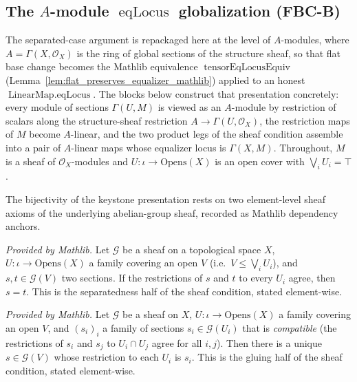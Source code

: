 \subsection{The \texorpdfstring{$A$}{A}-module \texorpdfstring{$\operatorname{eqLocus}$}{eqLocus} globalization (FBC-B)}

The separated-case argument is repackaged here at the level of \(A\)-modules, where
\(A = \Gamma(X,\mathcal{O}_X)\) is the ring of global sections of the structure sheaf, so that flat
base change becomes the Mathlib equivalence \(\operatorname{tensorEqLocusEquiv}\)
(Lemma~\ref{lem:flat_preserves_equalizer_mathlib}) applied to an honest
\(\operatorname{LinearMap.eqLocus}\). The blocks below construct that presentation concretely: every
module of sections \(\Gamma(U, M)\) is viewed as an \(A\)-module by restriction of scalars along the
structure-sheaf restriction \(A \to \Gamma(U,\mathcal{O}_X)\), the restriction maps of \(M\) become
\(A\)-linear, and the two product legs of the sheaf condition assemble into a pair of \(A\)-linear maps
whose equalizer locus is \(\Gamma(X, M)\). Throughout, \(M\) is a sheaf of
\(\mathcal{O}_X\)-modules and \(U : \iota \to \mathrm{Opens}(X)\) is an open cover with
\(\bigvee_i U_i = \top\).

The bijectivity of the keystone presentation rests on two element-level sheaf axioms of the underlying
abelian-group sheaf, recorded as Mathlib dependency anchors.

\begin{lemma}
  \label{lem:sheaf_eq_of_locally_eq_mathlib}
  \mathlibok
  \textit{Provided by Mathlib.}
  Let \(\mathcal{G}\) be a sheaf on a topological space \(X\), \(U : \iota \to \mathrm{Opens}(X)\) a
  family covering an open \(V\) (i.e.\ \(V \le \bigvee_i U_i\)), and \(s, t \in \mathcal{G}(V)\) two
  sections. If the restrictions of \(s\) and \(t\) to every \(U_i\) agree, then \(s = t\). This is the
  separatedness half of the sheaf condition, stated element-wise.
\end{lemma}

\begin{lemma}
  \label{lem:sheaf_existsUnique_gluing_mathlib}
  \mathlibok
  \textit{Provided by Mathlib.}
  Let \(\mathcal{G}\) be a sheaf on \(X\), \(U : \iota \to \mathrm{Opens}(X)\) a family covering an open
  \(V\), and \((s_i)_i\) a family of sections \(s_i \in \mathcal{G}(U_i)\) that is \emph{compatible}
  (the restrictions of \(s_i\) and \(s_j\) to \(U_i \cap U_j\) agree for all \(i, j\)). Then there is a
  unique \(s \in \mathcal{G}(V)\) whose restriction to each \(U_i\) is \(s_i\). This is the gluing half
  of the sheaf condition, stated element-wise.
\end{lemma}

